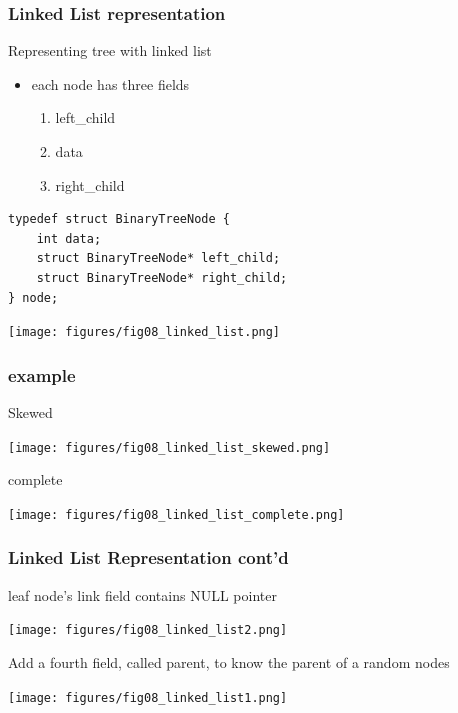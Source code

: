 \documentclass[newPxFont,sthlmFooter,nooffset]{beamer}
\begin{document}
\begin{frame}[t, fragile]
  \frametitle{Linked List representation}
Representing tree with linked list
\begin{itemize}
\item each node has three fields
  \begin{enumerate}
  \item left\_child
  \item data
  \item right\_child
  \end{enumerate}
\end{itemize}

\begin{lstlisting}
typedef struct BinaryTreeNode {
    int data;
    struct BinaryTreeNode* left_child;
    struct BinaryTreeNode* right_child;
} node;
\end{lstlisting}
\begin{center}
        \texttt{[image: figures/fig08\_linked\_list.png]}
\end{center}
\end{frame}


\begin{frame}[t]
  \frametitle{example}
Skewed

  \begin{center}
\vspace{-1em}
    \texttt{[image: figures/fig08\_linked\_list\_skewed.png]}
  \end{center}

complete 
  \begin{center}
\vspace{-1em}
    \texttt{[image: figures/fig08\_linked\_list\_complete.png]}
  \end{center}

\end{frame}


\begin{frame}[t]
  \frametitle{Linked List Representation cont'd}
leaf node's link field contains NULL pointer

  \begin{center}
\vspace{-1em}
    \texttt{[image: figures/fig08\_linked\_list2.png]}
  \end{center}

Add a fourth field, called parent, to know the parent of a random nodes
  \begin{center}
\vspace{-1em}
    \texttt{[image: figures/fig08\_linked\_list1.png]}
  \end{center}

\end{frame}
\end{document}
